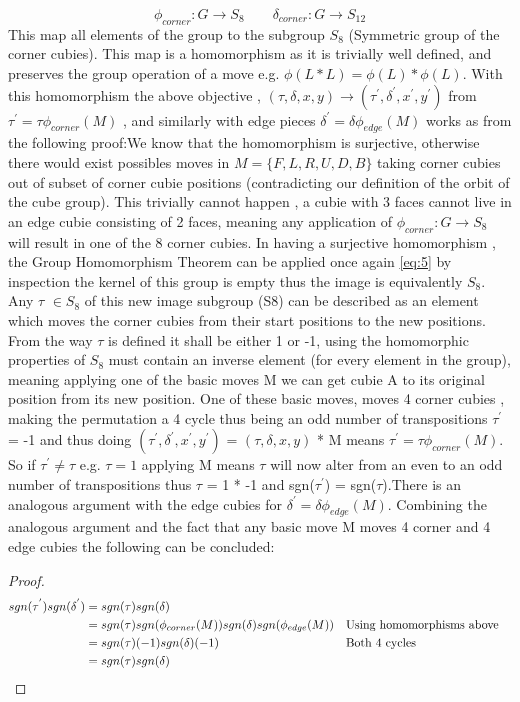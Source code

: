 \documentclass{article}
\begin{document}
\begin{equation}
\phi_{corner}: G \rightarrow S_{8}\quad \quad 
\delta_{corner}: G \rightarrow S_{12}
\end{equation}
This map all elements of the group to the subgroup $S_{8}$ (Symmetric group of the corner cubies). This map is a homomorphism as it is trivially well defined, and preserves the group operation of a move e.g. $\phi (L*L) = \phi (L) * \phi(L)$. With this homomorphism the above objective , $(\tau,\delta, x, y) \longrightarrow (\tau^{'},\delta^{'}, x^{'}, y^{'})$ from $\tau^{'} = \tau\phi_{corner}(M) $ , and similarly with edge pieces $\delta^{'} = \delta\phi_{edge}(M) $ works as from the following proof:\newline We know that the homomorphism is surjective, otherwise there would exist possibles moves in $M= \{{F,L,R,U,D,B}\}$ taking corner cubies out of subset of corner cubie positions (contradicting our definition of the orbit of the cube group). This trivially cannot happen , a cubie with 3 faces cannot live in an edge cubie consisting of 2 faces, meaning any application of $\phi_{corner}: G \rightarrow S_{8}$ will result in one of the 8 corner cubies. In having a surjective homomorphism , the Group Homomorphism Theorem can be applied once again \eqref{eq:5} by inspection the kernel of this group is empty thus the image is equivalently $S_{8}$. Any $\tau$ $\in S_{8}$ of this new image subgroup (S8) can be described as an element which moves the corner cubies from their start positions to the new positions. From the way $\tau$ is defined it shall be either 1 or -1, using the homomorphic properties of $S_{8}$ must contain an inverse element (for every element in the group), meaning applying one of the basic moves M we can get cubie A to its original position from its new position. One of these basic moves, moves 4 corner cubies , making the permutation a 4 cycle thus being an odd number of transpositions $\tau^{'}$ = -1 and thus doing $(\tau^{'} ,\delta^{'} , x^{'} , y^{'} )$ = $(\tau,\delta, x, y)$ * M means $\tau^{'} = \tau\phi_{corner}(M)$. So if $\tau^{'} \neq \tau$ e.g. $\tau = 1$ applying M means $\tau$ will now alter from an even to an odd number of transpositions thus $\tau$ = 1 * -1 and sgn($\tau^{'}$) = sgn($\tau$).\newline There is an analogous argument with the edge cubies for $\delta^{'} = \delta\phi_{edge}(M) $. Combining the analogous argument and the fact that any basic move M moves 4 corner and 4 edge cubies the following can be concluded:
\begin{proof}
\begin{align*}
sgn(\tau^{'}) sgn(\delta^{'}) &= sgn(\tau)sgn(\delta) \\ 
		&= sgn(\tau)sgn(\phi_{corner}(M))sgn(\delta)sgn(\phi_{edge}(M))&&\text{Using homomorphisms above}  \\
        &= sgn(\tau)(-1)sgn(\delta)(-1) &&\text{Both 4 cycles}  \\
        &=  sgn(\tau)sgn(\delta)  &&\qedhere
\end{align*}
\end{proof}
\end{document}
